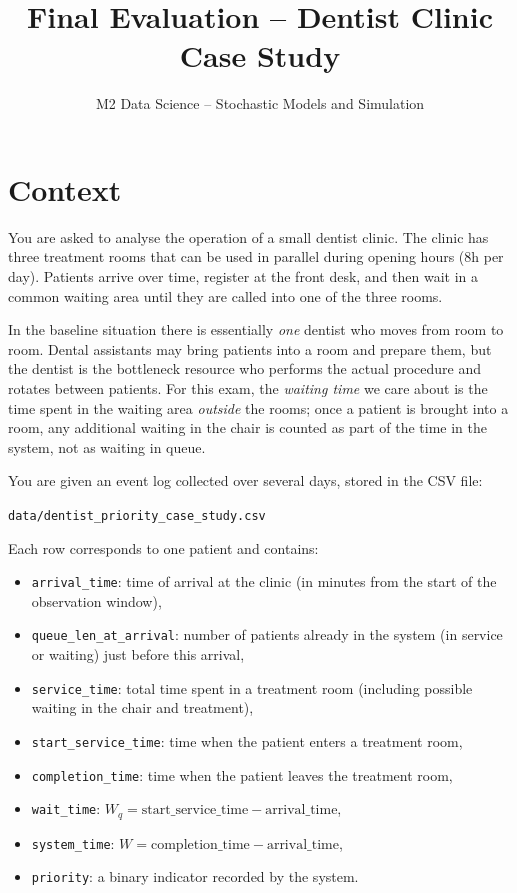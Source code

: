 \documentclass[a4paper,11pt]{article}
\title{Final Evaluation -- Dentist Clinic Case Study}
\author{M2 Data Science -- Stochastic Models and Simulation}
\date{}
\begin{document}
\maketitle

\section*{Context}

You are asked to analyse the operation of a small dentist clinic. The clinic has three treatment rooms that can be used in parallel during opening hours (8h per day). Patients arrive over time, register at the front desk, and then wait in a common waiting area until they are called into one of the three rooms.

In the baseline situation there is essentially \emph{one} dentist who moves from room to room. Dental assistants may bring patients into a room and prepare them, but the dentist is the bottleneck resource who performs the actual procedure and rotates between patients. For this exam, the \emph{waiting time} we care about is the time spent in the waiting area \emph{outside} the rooms; once a patient is brought into a room, any additional waiting in the chair is counted as part of the time in the system, not as waiting in queue.

You are given an event log collected over several days, stored in the CSV file:
\begin{center}
  \texttt{data/dentist\_priority\_case\_study.csv}
\end{center}
Each row corresponds to one patient and contains:
\begin{itemize}
  \item \texttt{arrival\_time}: time of arrival at the clinic (in minutes from the start of the observation window),
  \item \texttt{queue\_len\_at\_arrival}: number of patients already in the system (in service or waiting) just before this arrival,
  \item \texttt{service\_time}: total time spent in a treatment room (including possible waiting in the chair and treatment),
  \item \texttt{start\_service\_time}: time when the patient enters a treatment room,
  \item \texttt{completion\_time}: time when the patient leaves the treatment room,
  \item \texttt{wait\_time}: $W_q = \text{start\_service\_time} - \text{arrival\_time}$,
  \item \texttt{system\_time}: $W = \text{completion\_time} - \text{arrival\_time}$,
  \item \texttt{priority}: a binary indicator recorded by the system.
\end{itemize}
\end{document}
